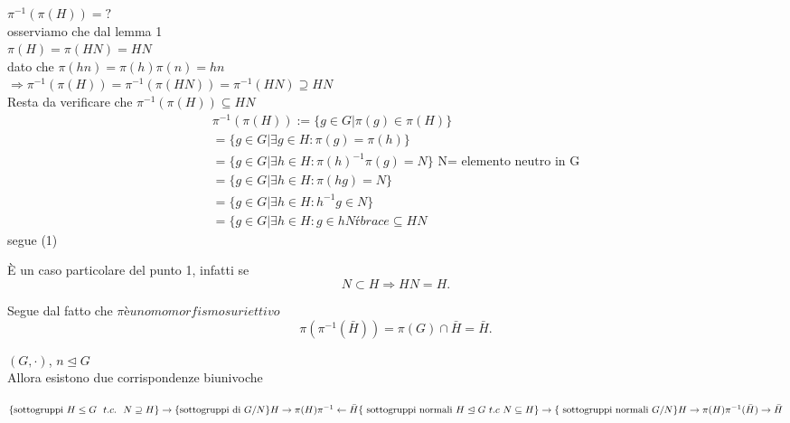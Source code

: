 \documentclass[12px]{article}
\begin{document}
	  \begin{dimo}[1]
		  $\pi^{-1}(\pi(H)) = ?$\\
		  osserviamo che dal lemma 1\\
		   $\pi(H) = \pi(HN) = HN$\\
		   dato che  $\pi(hn) = \pi(h)\pi(n) = hn$\\
		   $ \Rightarrow \pi^{-1}(\pi(H)) = \pi^{-1}(\pi(HN)) = \pi^{-1}(HN)\supseteq HN$ \\
		   Resta da verificare che $\pi^{-1}(\pi(H))\subseteq HN$\\
		    \begin{gather*}
			    \pi^{-1}(\pi(H)):=\lbrace g\in G|\pi(g)\in \pi(H)\rbrace\\
			    =\lbrace g\in G|\exists g\in H:\pi(g) = \pi(h)\rbrace\\
			    =\lbrace g\in G| \exists h\in H: \pi(h)^{-1}\pi(g)=N\rbrace \text{ N= elemento neutro in G}\\
			    =\lbrace g\in G|\exists h\in H: \pi(hg) = N\rbrace\\
			    =\lbrace g\in G | \exists h\in H: h^{-1}g\in N\rbrace\\
			    =\lbrace g\in G | \exists h\in H: g\in hNŕbrace \subseteq HN
		   \end{gather*}
		   segue (1)
	  \end{dimo}
	  \begin{dimo}[2]
	  	È un caso particolare del punto 1, infatti se
		\[
		N\subset H \Rightarrow HN = H
		.\] 
	  \end{dimo}
	  \begin{dimo}[3]
	  	Segue dal fatto che $\pi è un omomorfismo suriettivo $
		 \[
			 \pi(\pi^{-1}(\bar H))=\pi (G)\cap \bar H = \bar H
		.\] 
	  \end{dimo}
	  \begin{teo}
		$(G,\cdot)$, $n\trianglelefteq G$\\
		Allora esistono due corrispondenze biunivoche
		 \begin{center}
		 	
			 $\lbrace \text{sottogruppi } H\leq G \ \ t.c. \ \ N\supseteq H\rbrace \rightarrow \{\text{sottogruppi di } G/N\rbrace\\
			 H \rightarrow \pi (H)\\
			 \pi^{-1} \leftarrow \bar H\\
			 \lbrace \text{ sottogruppi normali } H\trianglelefteq G \ t.c \ N\subseteq H\rbrace \rightarrow \lbrace \text{ sottogruppi normali } G/N \rbrace\\
			 H \rightarrow \pi(H)\\
			 \pi^{-1}(\bar H) \rightarrow \bar H$
		 \end{center}
	  \end{teo}
\end{document}
